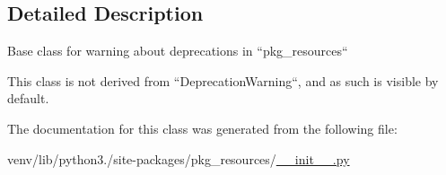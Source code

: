 \subsection{Detailed Description}
\begin{DoxyVerb}Base class for warning about deprecations in ``pkg_resources``

This class is not derived from ``DeprecationWarning``, and as such is
visible by default.
\end{DoxyVerb}
 

The documentation for this class was generated from the following file\+:\begin{DoxyCompactItemize}
\item 
venv/lib/python3./site-\/packages/pkg\+\_\+resources/\hyperlink{venv_2lib_2python3_89_2site-packages_2pkg__resources_2____init_____8py}{\+\_\+\+\_\+init\+\_\+\+\_\+.\+py}\end{DoxyCompactItemize}

